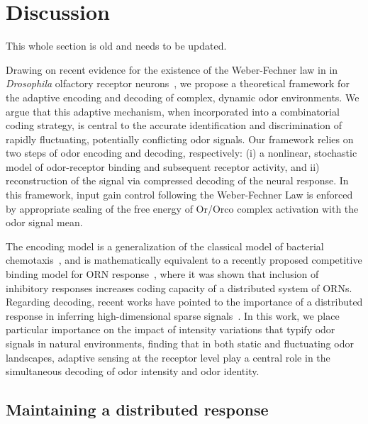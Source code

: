 


\section{Discussion}

{\color{blue} This whole section is old and needs to be updated.}

Drawing on recent evidence for the existence of the Weber-Fechner law in in \textit{Drosophila} olfactory receptor neurons~\cite{cafaro_WL, cao_WL,  srinivas_elife}, we propose a theoretical framework for the adaptive encoding and decoding of complex, dynamic odor environments. We argue that this adaptive mechanism, when incorporated into a combinatorial coding strategy, is central to the accurate identification and discrimination of rapidly fluctuating, potentially conflicting odor signals. Our framework relies on two steps of odor encoding and decoding, respectively: (i) a nonlinear, stochastic model of odor-receptor binding and subsequent receptor activity, and ii) reconstruction of the signal via compressed decoding of the neural response. In this framework, input gain control following the Weber-Fechner Law is enforced by appropriate scaling of the free energy of Or/Orco complex activation with the odor signal mean. 

The encoding model is a generalization of the classical model of bacterial chemotaxis~\cite{tu_shimizu_berg}, and is mathematically equivalent to a recently proposed competitive binding model for ORN response~\cite{Cao_Tu_WL}, where it was shown that inclusion of inhibitory responses increases coding capacity of a distributed system of ORNs. Regarding decoding, recent works have pointed to the importance of a distributed response in inferring high-dimensional sparse signals~\cite{vijay_1, vijay_2, sharpee_zhang}. In this work, we place particular importance on the impact of intensity variations that typify odor signals in natural environments, finding that in both static and fluctuating odor landscapes, adaptive sensing at the receptor level play a central role in the simultaneous decoding of odor intensity and odor identity. 


\subsection{Maintaining a distributed response}

